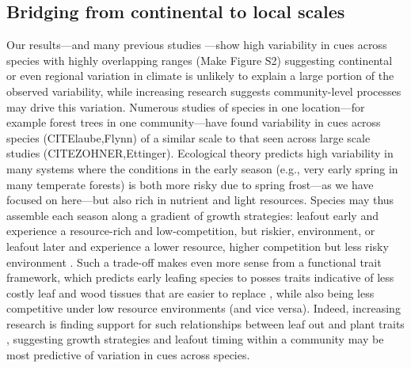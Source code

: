 \documentclass[12pt]{article}
\begin{document}
\subsection{Bridging from continental to local scales}
Our results---and many previous studies \citet{Zohner:2017aa}---show high variability in cues across species with highly overlapping ranges (Make Figure S2) suggesting continental or even regional variation in climate is unlikely to explain a large portion of the observed variability, while increasing research suggests community-level processes may drive this variation. Numerous studies of species in one location---for example forest trees in one community---have found variability in cues across species (CITElaube,Flynn) 
 of a similar scale to that seen across large scale studies (CITEZOHNER,Ettinger). Ecological theory predicts high variability in many systems where the conditions in the early season (e.g., very early spring in many temperate forests) is both more risky due to spring frost---as we have focused on here---but also rich in nutrient and light resources. Species may thus assemble each season along a gradient of growth strategies: leafout early and experience a resource-rich and low-competition, but riskier, environment, or leafout later and experience a lower resource, higher competition but less risky environment \citep{Sakai1987,Rathcke1985,Lopez2008}. Such a trade-off makes even more sense from a functional trait framework, which predicts early leafing species to posses traits indicative of less costly leaf and wood tissues that are easier to replace \citep{Reich1997,Wright2004}, while also being less competitive under low resource environments (and vice versa). Indeed, increasing research is finding support for such relationships between leaf out and plant traits \citep{Wang2021,Sporbert2022}, suggesting growth strategies and leafout timing within a community may be most predictive of variation in cues across species. 
 
\end{document}
